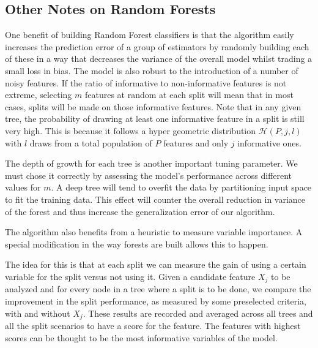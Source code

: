 
\subsection{Other Notes on Random Forests}
One benefit of building Random Forest classifiers is that the algorithm easily increases the prediction error of a group of estimators by randomly building each of these in a way that decreases the variance of the overall model whilst trading a small loss in bias. The model is also robust to the introduction of a number of noisy features. If the ratio of informative to non-informative features is not extreme, selecting $m$ features at random at each split will mean that in most cases, splits will be made on those informative features. Note that in any given tree, the probability of drawing at least one informative feature in a split is still very high. This is because it follows a hyper geometric distribution $\mathcal{H}(P,j,l)$ with $l$ draws from a total population of $P$ features and only $j$ informative ones.

The depth of growth for each tree is another important tuning parameter. We must chose it correctly by assessing the model's performance across different values for $m$. A deep tree will tend to overfit the data by partitioning input space to fit the training data. This effect will counter the overall reduction in variance of the forest and thus increase the generalization error of our algorithm.


The algorithm also benefits from a heuristic to measure variable importance.
A special modification in the way forests are built allows this to happen.

The idea for this is that at each split we can measure the gain of using a certain variable for the split versus not using it. Given a candidate feature $X_j$ to be analyzed and for every node in a tree where a split is to be done, we compare the improvement in the split performance, as measured by some preselected criteria, with and without $X_j$. These results are recorded and averaged across all trees and all the split scenarios to have a score for the feature. The features with highest scores can be thought to be the most informative variables of the model.

